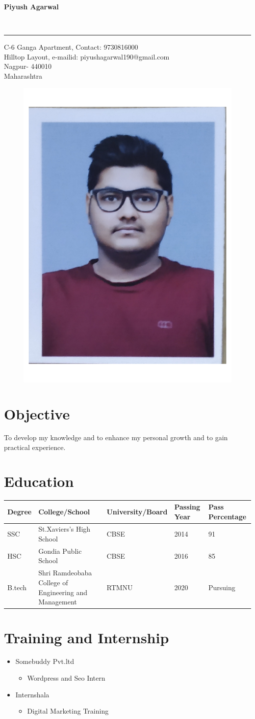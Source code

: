 \documentclass{article}
\begin{document}
	
{\begin{center}
		
	\end{center}\Huge\textbf{Piyush Agarwal}}
\\
\rule{\paperwidth}{0.2ex}
C-6 Ganga Apartment,\hspace{24ex} Contact: 9730816000
\\
Hilltop Layout, \hspace{32ex} e-mailid: piyushagarwal190@gmail.com
\\
Nagpur- 440010 
\\
Maharashtra
\begin{flushright}
	\begin{figure}[h]
		\includegraphics[width=15ex]{PIYUSH7}
	\end{figure}
\end{flushright}
\section{Objective}
{\large To develop my knowledge and to enhance my personal growth and to gain practical experience.}
\section{Education}
\begin{tabular}{ |p{3cm}|p{3cm}|p{3cm}|p{2cm}|p{3cm}| }
	\hline
	Degree& College/School &University/Board &Passing Year &Pass Percentage 
	\\
	\hline
	\hline
	SSC & St.Xaviers's High School &CBSE &2014 &91 \\
	\hline
	HSC & Gondia Public School   & CBSE &2016 &85 \\
	\hline
	B.tech &Shri Ramdeobaba College of Engineering and Management & RTMNU &2020 &Pursuing \\
		\hline
\end{tabular}
\section{Training and Internship}
\begin{itemize}
	\item{ Somebuddy Pvt.ltd
		\begin{itemize}
			\item Wordpress and Seo Intern
		\end{itemize}}
	\item { Internshala
		\begin{itemize}
			\item Digital Marketing Training
		\end{itemize}}
\end{itemize}
\end{document}
